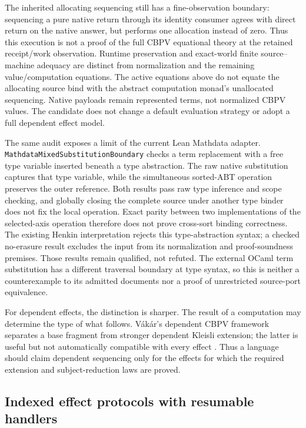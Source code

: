 \documentclass[11pt]{article}
\theoremstyle{definition}
\theoremstyle{remark}
\begin{document}
The inherited allocating sequencing still has a fine-observation boundary:
sequencing a pure native return through its identity consumer agrees with
direct return on the native answer, but performs one allocation instead of
zero. Thus this execution is not a proof of the full CBPV equational theory
at the retained receipt/work observation. Runtime preservation and exact-world
finite source--machine adequacy are distinct from normalization and the
remaining value/computation equations. The active equations above do not
equate the allocating source bind with the abstract computation monad's
unallocated sequencing. Native payloads remain represented
terms, not normalized CBPV values. The candidate does not change a default
evaluation strategy or adopt a full dependent effect model.

The same audit exposes a limit of the current Lean Mathdata adapter.
\nolinkurl{MathdataMixedSubstitutionBoundary} checks a term replacement with
a free type variable inserted beneath a type abstraction. The raw native
substitution captures that type variable, while the simultaneous sorted-ABT
operation preserves the outer reference. Both results pass raw type inference
and scope checking, and globally closing the complete source under another
type binder does not fix the local operation. Exact parity between two
implementations of the selected-axis operation therefore does not prove
cross-sort binding correctness. The existing Henkin interpretation rejects
this type-abstraction syntax; a checked no-erasure result excludes the input
from its normalization and proof-soundness premises. Those results remain
qualified, not refuted. The external OCaml term substitution has a different
traversal boundary at type syntax, so this is neither a counterexample to
its admitted documents nor a proof of unrestricted source-port equivalence.

For dependent effects, the distinction is sharper.  The result of a computation
may determine the type of what follows.  V\'ak\'ar's dependent CBPV framework
separates a base fragment from stronger dependent Kleisli extension; the latter
is useful but not automatically compatible with every effect
\cite{VakarDependentEffects}.  Thus a language should claim dependent sequencing
only for the effects for which the required extension and subject-reduction laws
are proved.

\subsection{Indexed effect protocols with resumable handlers}
\end{document}
